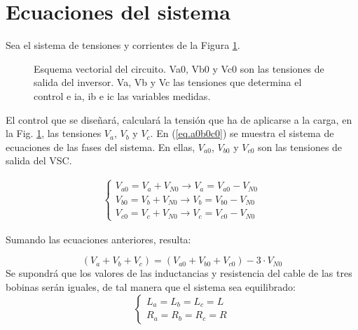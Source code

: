 \documentclass{report}
\begin{document}
\section{Ecuaciones del sistema} \label{sec.ecuacionesdelsistema}


Sea el sistema de tensiones y corrientes de la Figura \ref{fig.inversorecuaciones}. 

\begin{figure}[!h]
    \begin{center}
        \end{center}
        \caption{Esquema vectorial del circuito. Va0, Vb0 y Vc0 son las tensiones de salida del inversor. Va, Vb y Vc las tensiones que determina el control e ia, ib e ic las variables medidas.}
        \label{fig.inversorecuaciones}
\end{figure}
El control que se diseñará, calculará la tensión que ha de aplicarse a la carga, en la Fig. \ref{fig.inversorecuaciones}, las tensiones $V_{a}$, $V_{b}$ y $V_{c}$. En (\ref{eq.a0b0c0}) se muestra el sistema de ecuaciones de las fases del sistema. En ellas, $V_{a0}$, $V_{b0}$ y $V_{c0}$ son las tensiones de salida del VSC.

\begin{eqnarray}
    \left\{\begin{array}{l}
    V_{a0} = V_{a} + V_{N0} \rightarrow V_{a} = V_{a0} - V_{N0} \\
    V_{b0} = V_{b} + V_{N0} \rightarrow V_{b} = V_{b0} - V_{N0} \\
    V_{c0} = V_{c} + V_{N0} \rightarrow V_{c} = V_{c0} - V_{N0}
\end{array} \right. \label{eq.a0b0c0}
\end{eqnarray}

Sumando las ecuaciones anteriores, resulta:

\begin{equation}
    (V_{a}+V_{b}+V_{c}) =(V_{a0}+V_{b0}+V_{c0}) - 3 \cdot V_{N0} \label{eq.sumaeqabc}
\end{equation}
Se supondrá que los valores de las inductancias y resistencia del cable de las tres bobinas serán iguales, de tal manera que el sistema sea equilibrado:
\begin{equation}
    \left\{\begin{array}{l}
    L_{a} = L_{b} = L_{c} = L \\
    R_{a} = R_{b} = R_{c} = R
    \end{array} \right.
\end{equation}
\end{document}
